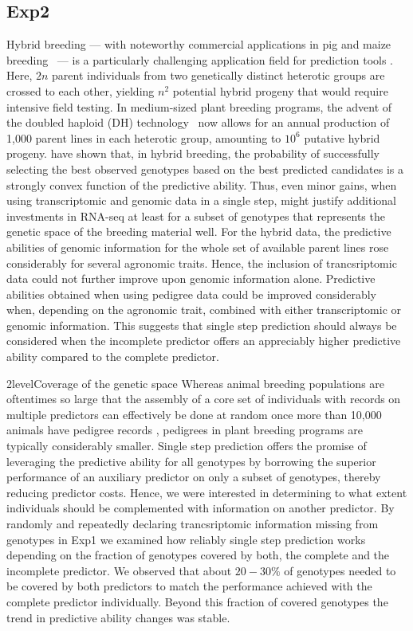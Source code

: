 \documentclass[12pt,titlepage]{article}
\begin{document}
\subsection{Exp2}
Hybrid breeding --- with noteworthy commercial applications in pig
\cite{Xiang2016,Tusell2016} and maize breeding~\cite{TheRoyalSociety2009} --- 
is a particularly challenging application field for prediction tools 
\cite{Kadam2016}.
Here, $2n$ parent individuals from two genetically distinct heterotic groups are
crossed to each other, yielding $n^{2}$ potential hybrid progeny that would
require intensive field testing.
In medium-sized plant breeding programs, the advent of the doubled haploid (DH) 
technology~\cite{Wedzony2009} now allows for an annual production of 1,000 
parent lines in each heterotic group, amounting to $10^{6}$ putative hybrid
progeny.
 have shown that, in hybrid breeding, the probability 
of successfully selecting the best observed genotypes based on the best 
predicted candidates is a strongly convex function of the predictive ability.
Thus, even minor gains, when using transcriptomic and genomic data in a
single step, might justify additional investments in RNA-seq at least for a
subset of genotypes that represents the genetic space of the breeding 
material well.
For the hybrid data, the predictive abilities of genomic information
for the whole set of available parent lines rose considerably for several
agronomic traits.
Hence, the inclusion of trancsriptomic data could not further improve upon
genomic information alone.
Predictive abilities obtained when using pedigree data could be 
improved considerably when, depending on the agronomic trait, combined with 
either transcriptomic or genomic information.
This suggests that single step prediction should always be considered when the
incomplete predictor offers an appreciably higher predictive ability compared
to the complete predictor.


\Genetics2level{Coverage of the genetic space}
Whereas animal breeding populations are oftentimes so large that the assembly 
of a core set of individuals with records on multiple predictors can effectively 
be done at random once more than 10,000 animals have pedigree records 
\cite{Fragomeni2015,Lourenco2015,Masuda2016}, pedigrees in plant breeding 
programs are typically considerably smaller.
Single step prediction offers the promise of leveraging the predictive ability
for all genotypes by borrowing the superior performance of an auxiliary
predictor on only a subset of genotypes, thereby reducing predictor costs.
Hence, we were interested in determining to what extent individuals should be 
complemented with information on another predictor.
By randomly and repeatedly declaring trancsriptomic information missing from
genotypes in Exp1 we examined how reliably single step prediction works
depending on the fraction of genotypes covered by both, the complete and the
incomplete predictor.
We observed that about $20-30\%$ of genotypes needed to be covered by both
predictors to match the performance achieved with the complete predictor
individually.
Beyond this fraction of covered genotypes the trend in predictive ability
changes was stable.
\end{document}
